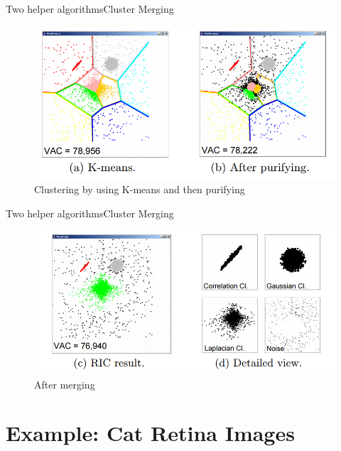 \documentclass{beamer}
\begin{document}
  \note{}

  \begin{frame}{Two helper algorithms}{Cluster Merging}
    \begin{figure}
      \centering
      \includegraphics[width=\linewidth]{imgs/cluster_merging1}
      \caption[]{Clustering by using K-means and then purifying\cite{Bohm2006-ts}}
      \label{fig:cluster_merging1}
    \end{figure}    
  \end{frame}
  
  \note{}
  
  \begin{frame}{Two helper algorithms}{Cluster Merging}
    \begin{figure}
      \centering
      \includegraphics[width=\linewidth]{imgs/cluster_merging2}
      \caption[]{After merging\cite{Bohm2006-ts}}
      \label{fig:cluster_merging2}
    \end{figure}    
  \end{frame}
  
  \note{}
  
  \section{Example: Cat Retina Images}
  
\end{document}

